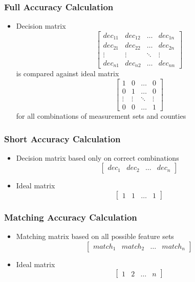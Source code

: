 \documentclass{beamer}
\begin{document}
\begin{frame}
\frametitle{Full Accuracy Calculation}
\begin{itemize}
\item{Decision matrix
\begin{equation}
\begin{bmatrix*}
dec_{11} & dec_{12} & \dots & dec_{1n} \\
dec_{21} & dec_{22} & \dots & dec_{2n} \\
\vdots & \vdots & \ddots & \vdots \\
dec_{n1} & dec_{n2} & \dots & dec_{nn} \end{bmatrix*}
\end{equation}
is compared against ideal matrix
\begin{equation}
\begin{bmatrix*}
1 & 0 & \dots & 0 \\
0 & 1 & \dots & 0 \\
\vdots & \vdots & \ddots & \vdots \\
0 & 0 & \dots & 1 \end{bmatrix*}
\end{equation}
for all combinations of measurement sets and counties}
\end{itemize}
\end{frame}

\begin{frame}
\frametitle{Short Accuracy Calculation}
\begin{itemize}
\item{Decision matrix based only on correct combinations
\begin{equation}
\begin{bmatrix*}
dec_1 & dec_2 & \dots & dec_n
\end{bmatrix*}
\end{equation}}
\item{Ideal matrix
\begin{equation}
\begin{bmatrix*}
1 & 1 & \dots & 1
\end{bmatrix*}
\end{equation}}
\end{itemize}
\end{frame}

\begin{frame}
\frametitle{Matching Accuracy Calculation}
\begin{itemize}
\item{Matching matrix based on all possible feature sets
\begin{equation}
\begin{bmatrix*}
match_1 & match_2 & \dots & match_n
\end{bmatrix*}
\end{equation}}
\item{Ideal matrix
\begin{equation}
\begin{bmatrix*}
1 & 2 & \dots & n
\end{bmatrix*}
\end{equation}}
\end{itemize}
\end{frame}
\end{document}
